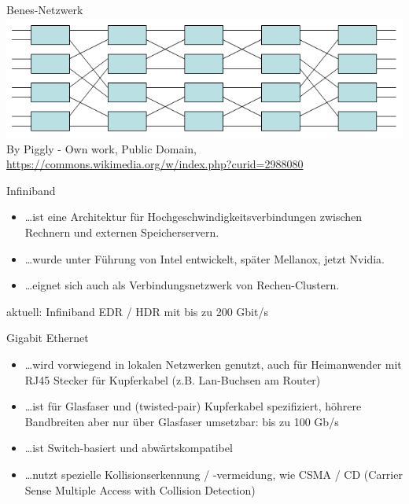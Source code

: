\begin{defi}{Benes-Netzwerk}
    \includegraphics[width=\textwidth]{images/Benesnetwork.png}
    By Piggly - Own work, Public Domain, \url{https://commons.wikimedia.org/w/index.php?curid=2988080}
\end{defi}

\begin{defi}{Infiniband}
    \begin{itemize}
        \item \ldots ist eine Architektur für Hochgeschwindigkeitsverbindungen zwischen Rechnern und externen Speicherservern.
        \item \ldots wurde unter Führung von Intel entwickelt, später Mellanox, jetzt Nvidia.
        \item \ldots eignet sich auch als Verbindungsnetzwerk von Rechen-Clustern.
    \end{itemize}
    aktuell: Infiniband EDR / HDR mit bis zu 200 Gbit/s
\end{defi}

\begin{defi}{Gigabit Ethernet}
    \begin{itemize}
        \item \ldots wird vorwiegend in lokalen Netzwerken genutzt,
              auch für Heimanwender mit RJ45 Stecker für Kupferkabel (z.B. Lan-Buchsen am Router)
        \item \ldots ist für Glasfaser und (twisted-pair) Kupferkabel spezifiziert,
              höhrere Bandbreiten aber nur über Glasfaser umsetzbar: bis zu 100 Gb/s
        \item \ldots ist Switch-basiert und abwärtskompatibel
        \item \ldots nutzt spezielle Kollisionserkennung / -vermeidung,
              wie CSMA / CD (Carrier Sense Multiple Access with Collision Detection)
    \end{itemize}
\end{defi}

